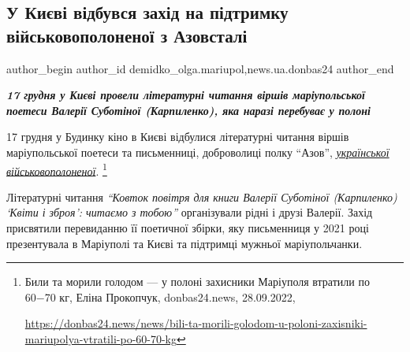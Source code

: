  
 
 
 
 
 
\subsection{У Києві відбувся захід на підтримку військовополоненої з Азовсталі}
\label{sec:17_12_2022.stz.news.ua.donbas24.1.kyiv_zaxid_pidtrym_polonena_azovstal}
 
\ifcmt
 author_begin
   author_id demidko_olga.mariupol,news.ua.donbas24
 author_end
\fi

\begin{center}
  \em\color{blue}\bfseries\Large
17 грудня у Києві провели літературні читання віршів маріупольської поетеси Валерії Суботіної
(Карпиленко), яка наразі перебуває у полоні
\end{center}

17 грудня у Будинку кіно в Києві відбулися літературні читання віршів
маріупольської поетеси та письменниці, доброволиці полку \enquote{Азов}, \href{https://donbas24.news/news/bili-ta-morili-golodom-u-poloni-zaxisniki-mariupolya-vtratili-po-60-70-kg}{\emph{української
військовополоненої}}.%
\footnote{Били та морили голодом — у полоні захисники Маріуполя втратили по 60−70 кг, Еліна Прокопчук, donbas24.news, 28.09.2022, \par\url{https://donbas24.news/news/bili-ta-morili-golodom-u-poloni-zaxisniki-mariupolya-vtratili-po-60-70-kg}}

Літературні читання \emph{\enquote{Ковток повітря для книги Валерії
Суботіної (Карпиленко) \enquote{Квіти і зброя}: читаємо з тобою}} організували рідні і
друзі Валерії. Захід присвятили перевиданню її поетичної збірки, яку
письменниця у 2021 році презентувала в Маріуполі та Києві та підтримці мужньої
маріупольчанки.

